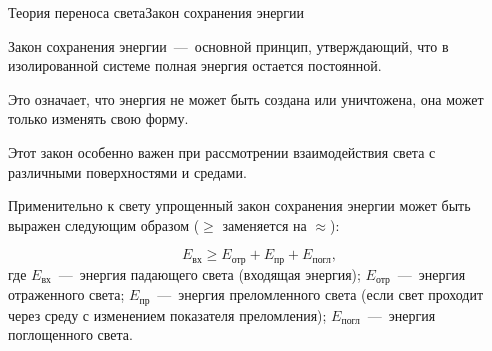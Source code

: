 \documentclass{beamer}
\begin{document}
	\begin{frame}{Теория переноса света}{Закон сохранения энергии}
		
		Закон сохранения энергии~---~основной принцип, утверждающий, что в изолированной системе полная энергия остается постоянной. 
		
		Это означает, что энергия не может быть создана или уничтожена, она может только изменять свою форму.
		
		Этот закон особенно важен при рассмотрении взаимодействия света с различными поверхностями и средами. 

		Применительно к свету упрощенный закон сохранения энергии может быть выражен следующим образом ($\geqslant$ заменяется на $\approx $):
		
		\[ E_{\text{вх}} \geqslant E_{\text{отр}} + E_{\text{пр}} + E_{\text{погл}} 
		,\]
		где
		\(E_{\text{вх}}\)~---~энергия падающего света (входящая энергия);
		\(E_{\text{отр}}\)~---~энергия отраженного света;
		\(E_{\text{пр}}\)~---~энергия преломленного света (если свет проходит через среду с изменением показателя преломления);
		\(E_{\text{погл}}\)~---~энергия поглощенного света.
		


	\end{frame}
\end{document}
